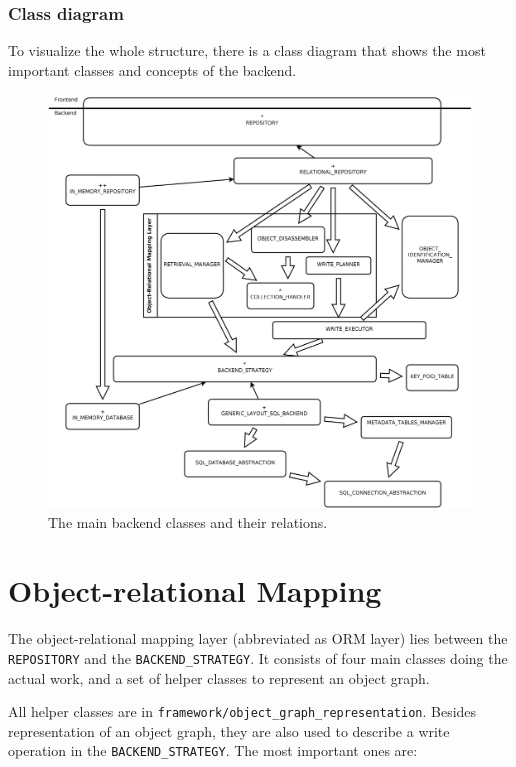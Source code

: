 \subsubsection{Class diagram}

To visualize the whole structure, there is a class diagram that shows the most important classes and concepts of the backend.

\begin{figure} [h]
\centering
\includegraphics[trim= 0mm -10mm 0mm -10mm,clip, width = 13cm] {includes/backend.png}
\caption{The main backend classes and their relations.}
\label{fig:backend_classes}
\end{figure}


\section{Object-relational Mapping}
\label{section:ORM}

The object-relational mapping layer (abbreviated as ORM layer) lies between the \lstinline!REPOSITORY! and the \lstinline!BACKEND_STRATEGY!.
It consists of four main classes doing the actual work, and a set of helper classes to represent an object graph.

All helper classes are in \lstinline!framework/object_graph_representation!.
Besides representation of an object graph, they are also used to describe a write operation in the \lstinline!BACKEND_STRATEGY!.
The most important ones are:

